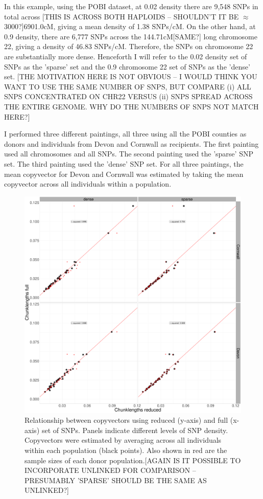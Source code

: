 In this example, using the POBI dataset, at 0.02 density there are 9,548 SNPs in total across {\color{red}[THIS IS ACROSS BOTH HAPLOIDS -- SHOULDN'T IT BE $\approx$3000?]6901.0cM}, giving a mean density of 1.38 SNPs/cM. On the other hand, at 0.9 density, there are 6,777 SNPs across the 144.71cM{\color{red}[SAME?]} long chromosome 22, giving a density of 46.83 SNPs/cM. Therefore, the SNPs on chromosome 22 are substantially more dense. Henceforth I will refer to the 0.02 density set of SNPs as the 'sparse' set and the 0.9 chromosome 22 set of SNPs as the 'dense' set. {\color{red}[THE MOTIVATION HERE IS NOT OBVIOUS -- I WOULD THINK YOU WANT TO USE THE SAME NUMBER OF SNPS, BUT COMPARE (i) ALL SNPS CONCENTRATED ON CHR22 VERSUS (ii) SNPS SPREAD ACROSS THE ENTIRE GENOME. WHY DO THE NUMBERS OF SNPS NOT MATCH HERE?]}

I performed {\color{red}three} different paintings, all {\color{red}three} using all the POBI counties as donors and individuals from Devon and Cornwall as recipients. The first painting used all chromosomes and all SNPs. The second painting used the 'sparse' SNP set. The third painting used the 'dense' SNP set. For all {\color{red}three} paintings, the mean copyvector for Devon and Cornwall was estimated by taking the mean copyvector across all individuals within a population. 

\begin{figure}[htp]
    \centering
    \includegraphics[width=1.0\textwidth]{../images/chapter1/dense_sparse_devon_cornwall_collapsed.pdf}
    \caption{Relationship between copyvectors using reduced (y-axis) and full (x-axis) set of SNPs. Panels indicate different levels of SNP density. Copyvectors were estimated by averaging across all individuals within each population (black points). Also shown in red are the sample sizes of each donor population.{\color{red}[AGAIN IS IT POSSIBLE TO INCORPORATE UNLINKED FOR COMPARISON -- PRESUMABLY 'SPARSE' SHOULD BE THE SAME AS UNLINKED?]}}
    \label{fig:dense_sparse_devon_cornwall_collapsed}
\end{figure}

